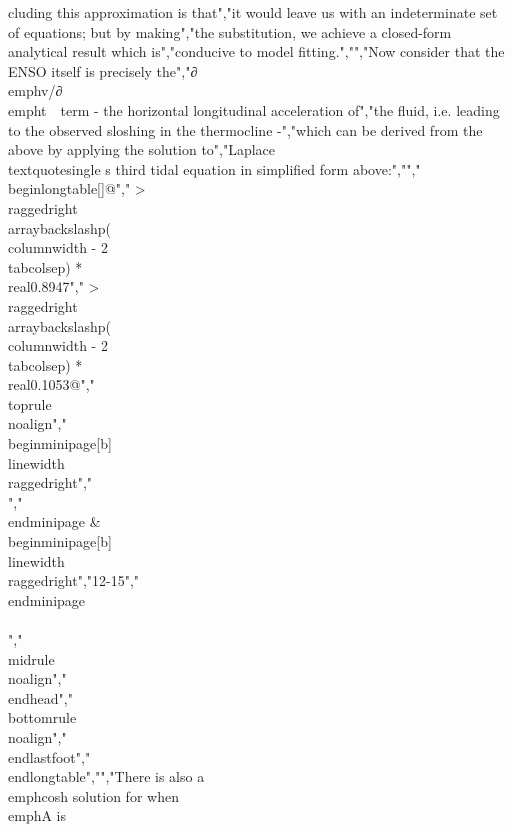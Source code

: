 {{{{{{{{{{cluding this approximation is that","it would leave us with an indeterminate set of equations; but by making","the substitution, we achieve a closed-form analytical result which is","conducive to model fitting.","","Now consider that the ENSO itself is precisely the","∂\\emph{v/}∂\\emph{t}~~term - the horizontal longitudinal acceleration of","the fluid, i.e. leading to the observed sloshing in the thermocline -","which can be derived from the above by applying the solution to","Laplace\\textquotesingle s third tidal equation in simplified form above:","","\\begin{longtable}[]{@{}","  >{\\raggedright\\arraybackslash}p{(\\columnwidth - 2\\tabcolsep) * \\real{0.8947}}","  >{\\raggedright\\arraybackslash}p{(\\columnwidth - 2\\tabcolsep) * \\real{0.1053}}@{}}","\\toprule\\noalign{}","\\begin{minipage}[b]{\\linewidth}\\raggedright","\\[\\frac{\\partial v}{\\partial t} = \\cos(\\sqrt{A}\\sum_{i = 1}^{i = N}{k_{i}\\sin(\\omega_{i}t)} + \\theta_{0})\\]","\\end{minipage} & \\begin{minipage}[b]{\\linewidth}\\raggedright","12-15","\\end{minipage} \\\\","\\midrule\\noalign{}","\\endhead","\\bottomrule\\noalign{}","\\endlastfoot","\\end{longtable}","","There is also a \\emph{cosh} solution for when \\emph{A} is }}}}}}}}}}
